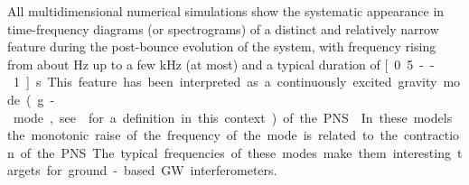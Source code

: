 
All multidimensional numerical simulations show the systematic appearance in time-frequency diagrams (or spectrograms) of a distinct and relatively narrow feature 
%
%
during the post-bounce evolution of the system, with frequency rising 
from about \unit[100]{Hz} up to a few kHz (at most) and a typical duration of \unit[0.5 -- 1]{s}. This feature has been interpreted as a continuously excited gravity mode (g-mode, see~\citep{kokkotas,Friedman:2013} for a definition in this context) of the PNS~\citep{murphy:09, mueller:13gw, Cerda:2013, Yakunin:2015wra, Kuroda:2016, Andresen:2017}. 
In these models the monotonic raise of the frequency of the mode is related to the contraction of the PNS. The {typical} frequencies of {these} modes make them interesting targets for
ground-based GW interferometers. 
 
